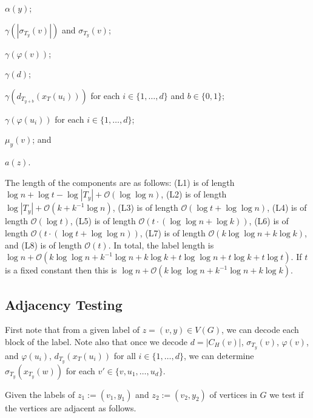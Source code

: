 \documentclass[kpfonts]{patmorin}
\newcommand{\snote}[1]{\fcolorbox{red}{yellow}{#1}}
\newcommand{\Oh}{\mathcal{O}}
\begin{document}
\begin{compactenum}[(L1)]
  \item\label{label-alpha} $\alpha(y)$;%
  \item $\gamma(|\sigma_{T_y}(v)|)$ and $\sigma_{T_y}(v)$; %
  \item $\gamma(\varphi(v))$;
  \item $\gamma(d)$;
  \item $\gamma(d_{T_{y+b}}(x_T(u_i)))$ for each $i\in\{1,\ldots,d\}$ and $b\in\{0,1\}$;
  \item $\gamma(\varphi(u_i))$ for each $i\in\{1,\ldots,d\}$;
  \item $\mu_y(v)$; and
  \item $a(z)$.
  \end{compactenum}
The length of the components are as follows: 
(L1) is of length $\log n + \log t -\log|T_y| + \Oh(\log\log n)$, 
(L2) is of length $\log|T_y| + \Oh(k+k^{-1}\log n)$, 
(L3) is of length $\Oh(\log t + \log\log n)$,
(L4) is of length $\Oh(\log t)$, 
(L5) is of length $\Oh(t\cdot (\log\log n + \log k))$, %
(L6) is of length $\Oh(t\cdot (\log t + \log\log n))$, 
(L7) is of length $\Oh(k\log\log n + k\log k)$, and 
(L8) is of length $\Oh(t)$.
In total, the label length is $\log n + \Oh(k\log\log n+k^{-1}\log n + k\log k + t \log\log n + t \log k + t \log t)$.
If $t$ is a fixed constant then this is  
$\log n + \Oh(k\log\log n+k^{-1}\log n + k\log k)$.

\subsection{Adjacency Testing}

First note that from a given label of $z=(v,y) \in V(G)$, we can decode each block of the label. 
Note also that once we decode $d=|C_H(v)|$, $\sigma_{T_y}(v)$, $\varphi(v)$, and $\varphi(u_i)$, $d_{T_y}(x_T(u_i))$ for all $i\in\{1,\ldots,d\}$, we can determine $\sigma_{T_y}(x_{T_y}(w))$ for each $v'\in\{v,u_1,\ldots,u_d\}$.

Given the labels of $z_1:=(v_1,y_1)$ and $z_2:=(v_2,y_2)$ of vertices in $G$ we test if the vertices are adjacent as follows.
\end{document}
